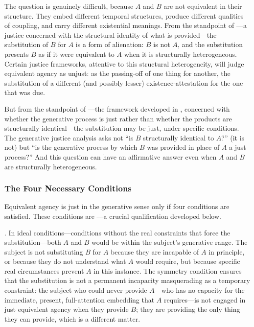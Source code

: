 
The question is genuinely difficult, because $A$ and $B$ are not equivalent in their structure. They embed different temporal structures, produce different qualities of coupling, and carry different existential meanings. From the standpoint of ---a justice concerned with the structural identity of what is provided---the substitution of $B$ for $A$ is a form of alienation: $B$ is not $A$, and the substitution presents $B$ as if it were equivalent to $A$ when it is structurally heterogeneous. Certain justice frameworks, attentive to this structural heterogeneity, will judge equivalent agency as unjust: as the passing-off of one thing for another, the substitution of a different (and possibly lesser) existence-attestation for the one that was due.

But from the standpoint of ---the framework developed in  \parencite{paperxv}, concerned with whether the generative process is just rather than whether the products are structurally identical---the substitution may be just, under specific conditions. The generative justice analysis asks not ``is $B$ structurally identical to $A$?'' (it is not) but ``is the generative process by which $B$ was provided in place of $A$ a just process?'' And this question can have an affirmative answer even when $A$ and $B$ are structurally heterogeneous.

\subsubsection{The Four Necessary Conditions}
\label{p16:subsubsec:four_conditions}

\noindent
Equivalent agency is just in the generative sense only if four conditions are satisfied. These conditions are ---a crucial qualification developed below.

. In ideal conditions---conditions without the real constraints that force the substitution---both $A$ and $B$ would be within the subject's generative range. The subject is not substituting $B$ for $A$ because they are incapable of $A$ in principle, or because they do not understand what $A$ would require, but because specific real circumstances prevent $A$ in this instance. The symmetry condition ensures that the substitution is not a permanent incapacity masquerading as a temporary constraint: the subject who could never provide $A$---who has no capacity for the immediate, present, full-attention embedding that $A$ requires---is not engaged in just equivalent agency when they provide $B$; they are providing the only thing they can provide, which is a different matter.

